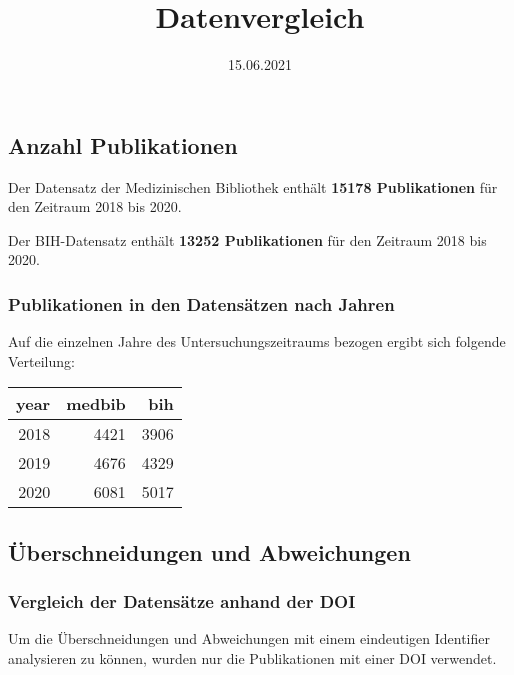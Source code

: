 \documentclass[
]{article}
\title{Datenvergleich}
\author{}
\date{\vspace{-2.5em}15.06.2021}
\begin{document}
\maketitle

\hypertarget{anzahl-publikationen}{%
\subsection{Anzahl Publikationen}\label{anzahl-publikationen}}

Der Datensatz der Medizinischen Bibliothek enthält \textbf{15178
Publikationen} für den Zeitraum 2018 bis 2020.

Der BIH-Datensatz enthält \textbf{13252 Publikationen} für den Zeitraum
2018 bis 2020.

\hypertarget{publikationen-in-den-datensuxe4tzen-nach-jahren}{%
\subsubsection{Publikationen in den Datensätzen nach
Jahren}\label{publikationen-in-den-datensuxe4tzen-nach-jahren}}

Auf die einzelnen Jahre des Untersuchungszeitraums bezogen ergibt sich
folgende Verteilung:

\begin{table}
\centering
\begin{tabular}{r|r|r}
\hline
year & medbib & bih\\
\hline
2018 & 4421 & 3906\\
\hline
2019 & 4676 & 4329\\
\hline
2020 & 6081 & 5017\\
\hline
\end{tabular}
\end{table}

\hypertarget{uxfcberschneidungen-und-abweichungen}{%
\subsection{Überschneidungen und
Abweichungen}\label{uxfcberschneidungen-und-abweichungen}}

\hypertarget{vergleich-der-datensuxe4tze-anhand-der-doi}{%
\subsubsection{Vergleich der Datensätze anhand der
DOI}\label{vergleich-der-datensuxe4tze-anhand-der-doi}}

Um die Überschneidungen und Abweichungen mit einem eindeutigen
Identifier analysieren zu können, wurden nur die Publikationen mit einer
DOI verwendet.
\end{document}
